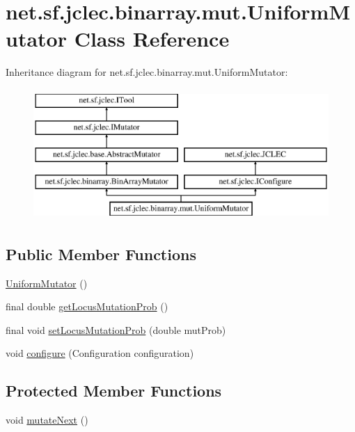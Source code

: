 \hypertarget{classnet_1_1sf_1_1jclec_1_1binarray_1_1mut_1_1_uniform_mutator}{\section{net.\-sf.\-jclec.\-binarray.\-mut.\-Uniform\-Mutator Class Reference}
\label{classnet_1_1sf_1_1jclec_1_1binarray_1_1mut_1_1_uniform_mutator}
}
Inheritance diagram for net.\-sf.\-jclec.\-binarray.\-mut.\-Uniform\-Mutator\-:\begin{figure}[H]
\begin{center}
\leavevmode
\includegraphics[height=5.000000cm]{classnet_1_1sf_1_1jclec_1_1binarray_1_1mut_1_1_uniform_mutator}
\end{center}
\end{figure}
\subsection*{Public Member Functions}
\begin{DoxyCompactItemize}
\item 
\hyperlink{classnet_1_1sf_1_1jclec_1_1binarray_1_1mut_1_1_uniform_mutator_a4420b4e6b12a6acd9dd8baee82fd2127}{Uniform\-Mutator} ()
\item 
final double \hyperlink{classnet_1_1sf_1_1jclec_1_1binarray_1_1mut_1_1_uniform_mutator_a2328bfe23915d467bef2b216ea31837d}{get\-Locus\-Mutation\-Prob} ()
\item 
final void \hyperlink{classnet_1_1sf_1_1jclec_1_1binarray_1_1mut_1_1_uniform_mutator_aff98e4a9e6cee9dd29af441f77b0db2f}{set\-Locus\-Mutation\-Prob} (double mut\-Prob)
\item 
void \hyperlink{classnet_1_1sf_1_1jclec_1_1binarray_1_1mut_1_1_uniform_mutator_a14b51a4033ffa9c681a288e7c8d96386}{configure} (Configuration configuration)
\end{DoxyCompactItemize}
\subsection*{Protected Member Functions}
\begin{DoxyCompactItemize}
\item 
void \hyperlink{classnet_1_1sf_1_1jclec_1_1binarray_1_1mut_1_1_uniform_mutator_ad631a7f477c8af9a61b8fdb64d61e9bd}{mutate\-Next} ()
\end{DoxyCompactItemize}

